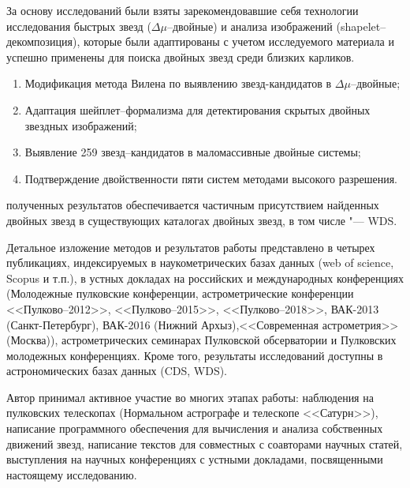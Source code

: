 {\methods} За основу исследований были взяты зарекомендовавшие себя технологии исследования быстрых звезд ($\Delta\mu$--двойные) и анализа изображений (shapelet--декомпозиция), которые были адаптированы с учетом исследуемого материала и успешно применены для поиска двойных звезд среди близких карликов.

{}
\begin{enumerate}
  \item Модификация метода Вилена по выявлению звезд-кандидатов в $\Delta\mu$--двойные;
  \item Адаптация шейплет--формализма для детектирования скрытых двойных звездных изображений;
  \item Выявление 259 звезд--кандидатов в маломассивные двойные системы;
  \item Подтверждение двойственности пяти систем методами высокого разрешения.
\end{enumerate}


{\reliability} полученных результатов обеспечивается частичным присутствием найденных двойных звезд в существующих каталогах двойных звезд, в том числе "--- WDS.


{\probation}
Детальное изложение методов и результатов работы представлено в четырех публикациях, индексируемых в наукометрических базах данных (web of science, Scopus и т.п.), в устных докладах на российских и международных конференциях (Молодежные пулковские конференции, астрометрические конференции <<Пулково--2012>>, <<Пулково--2015>>, <<Пулково--2018>>, ВАК-2013 (Санкт-Петербург), ВАК-2016 (Нижний Архыз),<<Современная астрометрия>> (Москва)), астрометрических семинарах Пулковской обсерватории и Пулковских молодежных конференциях. Кроме того, результаты исследований доступны в астрономических базах данных (CDS, WDS).

{\contribution} Автор принимал активное участие во многих этапах работы: наблюдения на пулковских  телескопах (Нормальном астрографе и телескопе <<Сатурн>>), написание программного обеспечения для вычисления и анализа собственных движений звезд, написание текстов для совместных с соавторами научных статей, выступления на научных конференциях с устными докладами, посвященными настоящему исследованию. 

